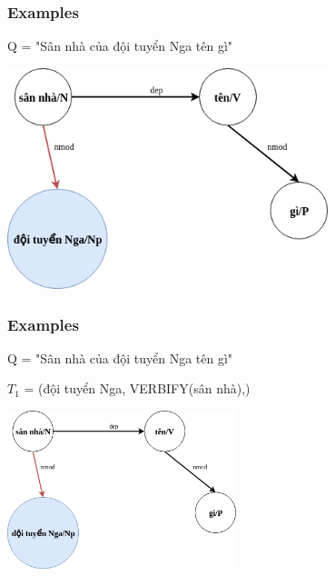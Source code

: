 \documentclass{beamer}
\begin{document}
\begin{frame}
	\frametitle{Examples}
	
	Q = "Sân nhà của đội tuyển Nga tên gì"
	
	\begin{center} 
		\centering 
			\includegraphics[width=0.7\textwidth,height=0.7\textheight,keepaspectratio]{secondextree2}
			\vspace{0.5cm} 
	\end{center}
		
\end{frame}


\begin{frame}
	\frametitle{Examples}
	
	Q = "Sân nhà của đội tuyển Nga tên gì"
	
	$T_1$ = (đội tuyển Nga, VERBIFY(sân nhà),)
	
	\begin{center} 
		\centering 
			\includegraphics[width=0.5\textwidth,height=0.5\textheight,keepaspectratio]{secondextree2}
			\vspace{0.5cm} 
	\end{center}
		
\end{frame}
\end{document}
